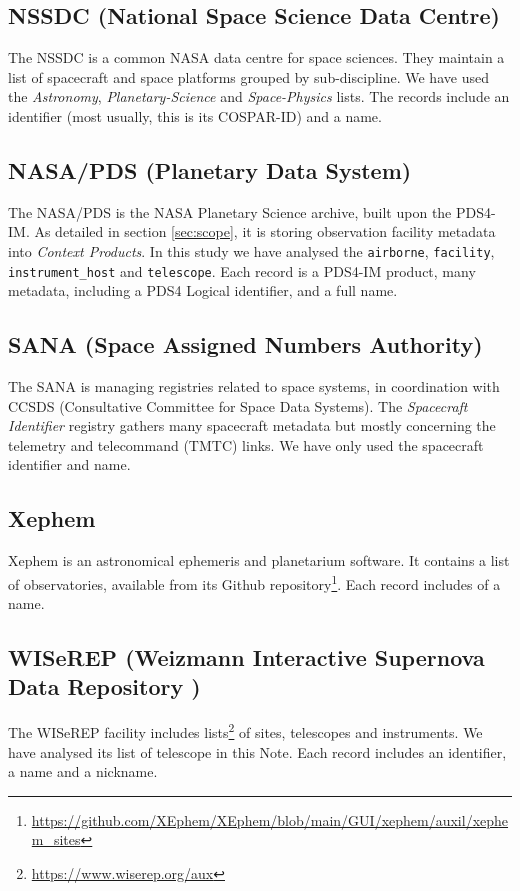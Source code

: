 \documentclass[11pt,a4paper]{ivoa}
\begin{document}
\subsection{NSSDC (National Space Science Data Centre)}
The NSSDC is a common NASA data centre for space sciences. They maintain a 
list of spacecraft and space platforms grouped by sub-discipline. We have 
used the \emph{Astronomy}, \emph{Planetary-Science} and \emph{Space-Physics} 
lists. The records include an identifier (most usually, this is its 
COSPAR-ID) and a name.

\subsection{NASA/PDS (Planetary Data System)}
The NASA/PDS is the NASA Planetary Science archive, built upon the 
PDS4-IM. As detailed in section \ref{sec:scope}, it is storing 
observation facility metadata into \emph{Context Products}. In this 
study we have analysed the \texttt{airborne}, \texttt{facility},  
\texttt{instrument\_host} and \texttt{telescope}. Each record is 
a PDS4-IM product, many metadata, including a PDS4 Logical 
identifier, and a full name.

\subsection{SANA (Space Assigned Numbers Authority)}
The SANA is managing registries related to space systems, in 
coordination with CCSDS (Consultative Committee for Space Data
Systems). The \emph{Spacecraft Identifier} registry gathers many
spacecraft metadata but mostly concerning the telemetry and 
telecommand (TMTC) links. We have only used the 
spacecraft identifier and name.  

\subsection{Xephem}
Xephem is an astronomical ephemeris and planetarium software. It
contains a list of observatories, available from its Github 
repository\footnote{\url{https://github.com/XEphem/XEphem/blob/main/GUI/xephem/auxil/xephem_sites}}.
Each record includes of a name.
  
\subsection{WISeREP (Weizmann Interactive Supernova Data Repository )}
The WISeREP facility includes lists\footnote{\url{https://www.wiserep.org/aux}} 
of sites, telescopes and instruments. We have analysed its list of telescope 
in this Note. Each record includes an identifier, a name and a 
nickname.
\end{document}
